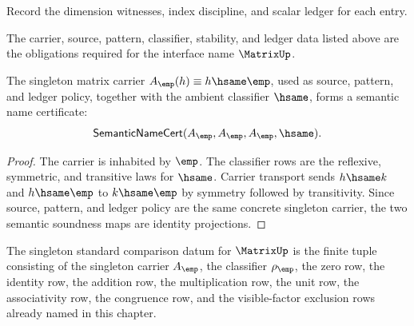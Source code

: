 \begin{definition}
\label{def:matrix-ledger-policy}
Record the dimension witnesses, index discipline, and scalar ledger for each entry.
\end{definition}

\begin{definition}
\label{def:matrix-certificate-obligations}
The carrier, source, pattern, classifier, stability, and ledger data listed above are the obligations required for the interface name \(\MatrixUp\).
\end{definition}
\begin{theorem}
\label{thm:matrix-singleton-carrier-semantic-namecert}
The singleton matrix carrier \(A_{\emp}(h)\equiv h\hsame\emp\), used as
source, pattern, and ledger policy, together with the ambient classifier
\(\hsame\), forms a semantic name certificate:
$$
\mathsf{SemanticNameCert}(A_{\emp},A_{\emp},A_{\emp},\hsame).
$$
\end{theorem}
\begin{proof}
The carrier is inhabited by \(\emp\). The classifier rows are the reflexive,
symmetric, and transitive laws for \(\hsame\). Carrier transport sends
\(h\hsame k\) and \(h\hsame\emp\) to \(k\hsame\emp\) by symmetry followed by
transitivity. Since source, pattern, and ledger policy are the same concrete
singleton carrier, the two semantic soundness maps are identity projections.
\end{proof}

\begin{definition}
\label{def:matrix-singleton-standard-comparison-datum}
The singleton standard comparison datum for $\MatrixUp$ is the finite tuple
consisting of the singleton carrier $A_{\emp}$, the classifier $\rho_{\emp}$,
the zero row, the identity row, the addition row, the multiplication row, the
unit row, the associativity row, the congruence row, and the visible-factor
exclusion rows already named in this chapter.
\end{definition}

